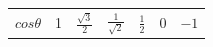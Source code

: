 {{\begin{center}
\begin{tabular}[t]{|l|l|l|l|l|l|l|}
     \tabularnewline\cline{1-1}\cline{2-2}\cline{3-3}\cline{4-4}\cline{5-5}\cline{6-6}\cline{7-7}
                \begin{math}cos\theta \end{math}
               &
        1 &
                \begin{math}\frac{\sqrt{3}}{2}\end{math}
               &
                \begin{math}\frac{1}{\sqrt{2}}\end{math}
               &
                \begin{math}\frac{1}{2}\end{math}
               &
        0 &
                \begin{math}-1\end{math}
     \tabularnewline\cline{1-1}\cline{2-2}\cline{3-3}\cline{4-4}\cline{5-5}\cline{6-6}\cline{7-7}

\end{tabular}
\end{center}}}
